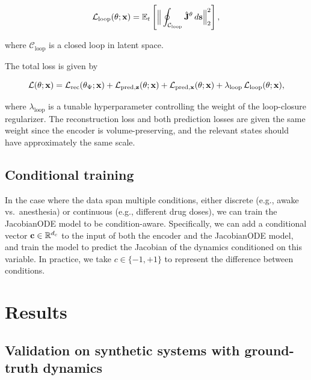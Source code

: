 \begin{equation}
\mathcal{L}_{\mathrm{loop}}(\theta;\vb{x}) = \mathbb{E}_t\left[\Big\|\oint_{\mathcal{C}_{\mathrm{loop}}}\hat{\mathbf{J}}^{\theta}\, d\vb{s}\Big\|_2^2\right],
\label{eq:interareal-control-loop-closure-loss}
\end{equation}

where $\mathcal{C}_{\mathrm{loop}}$ is a closed loop in latent space.

 The total loss is given by

\begin{equation}
\mathcal{L}(\theta;\vb{x}) = \mathcal{L}_{\mathrm{rec}}(\theta_{\Psi};\vb{x}) + \mathcal{L}_{\mathrm{pred}, \mathbf{z}}(\theta;\vb{x}) + \mathcal{L}_{\mathrm{pred}, \mathbf{x}}(\theta;\vb{x}) + \lambda_{\mathrm{loop}}\,\mathcal{L}_{\mathrm{loop}}(\theta;\vb{x}),
\label{eq:interareal-control-total-loss}
\end{equation}

where $\lambda_{\mathrm{loop}}$ is a tunable hyperparameter controlling the weight of the loop-closure regularizer. The reconstruction loss and both prediction losses are given the same weight since the encoder is volume-preserving, and the relevant states should have approximately the same scale.

\subsection{Conditional training}

In the case where the data span multiple conditions, either discrete (e.g., awake vs.\ anesthesia) or continuous (e.g., different drug doses), we can train the JacobianODE model to be condition-aware. Specifically, we can add a conditional vector $\vb{c} \in \mathbb{R}^{d_c}$ to the input of both the encoder and the JacobianODE model, and train the model to predict the Jacobian of the dynamics conditioned on this variable. In practice, we take $c \in \{-1,+1\}$ to represent the difference between conditions.

\section{Results}
\label{sec:interareal-control-results}

\subsection{Validation on synthetic systems with ground-truth dynamics}
\label{sec:interareal-control-validation}

